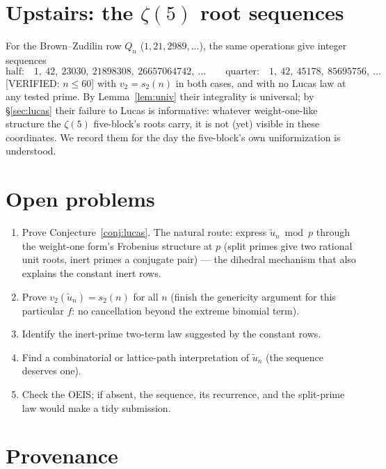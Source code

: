 \documentclass[11pt,reqno]{amsart}
\theoremstyle{plain}
\theoremstyle{definition}
\theoremstyle{remark}
\newcommand{\ut}{\tilde u}
\newcommand{\VerifiedR}[1]{\textup{\textsf{[VERIFIED: #1]}}}
\begin{document}
\section{Upstairs: the $\zeta(5)$ root sequences}

For the Brown--Zudilin row $Q_n$ ($1,21,2989,\dots$), the same operations
give integer sequences
\[
\text{half:}\quad 1,\ 42,\ 23030,\ 21898308,\ 26657064742,\ \dots
\qquad
\text{quarter:}\quad 1,\ 42,\ 45178,\ 85695756,\ \dots
\]
\VerifiedR{$n\le60$} with $v_2=s_2(n)$ in both cases, and with no Lucas
law at any tested prime. By Lemma~\ref{lem:univ} their integrality is
universal; by \S\ref{sec:lucas} their failure to Lucas is informative:
whatever weight-one-like structure the $\zeta(5)$ five-block's roots
carry, it is not (yet) visible in these coordinates. We record them for
the day the five-block's own uniformization is understood.

\section{Open problems}

\begin{enumerate}[leftmargin=2em,label=\textbf{P\arabic*.}]
\item Prove Conjecture~\ref{conj:lucas}. The natural route: express
$\ut_n\bmod p$ through the weight-one form's Frobenius structure at $p$
(split primes give two rational unit roots, inert primes a conjugate
pair) --- the dihedral mechanism that also explains the constant inert
rows.
\item Prove $v_2(\ut_n)=s_2(n)$ for all $n$ (finish the genericity
argument for this particular $f$: no cancellation beyond the extreme
binomial term).
\item Identify the inert-prime two-term law suggested by the constant
rows.
\item Find a combinatorial or lattice-path interpretation of $\ut_n$ (the
sequence deserves one).
\item Check the OEIS; if absent, the sequence, its recurrence, and the
split-prime law would make a tidy submission.
\end{enumerate}

\section*{Provenance}
\end{document}
